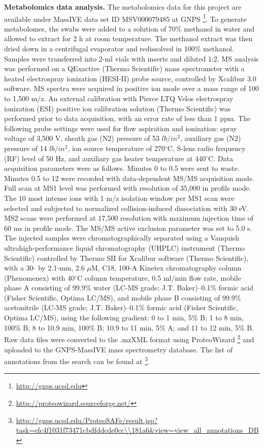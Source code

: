 \textbf{Metabolomics data analysis.} The metabolomics data for this project are
available under MassIVE data set ID MSV000079485 at GNPS \footnote{\url{http://gnps.ucsd.edu}}.
To generate metabolomes, the swabs were added to a solution of 70\% methanol in water and
allowed to extract for 2 h at room temperature. The methanol extract was then dried down in
a centrifugal evaporator and redissolved in 100\% methanol. Samples were transferred into
2-ml vials with inserts and diluted 1:2. MS analysis was performed on a QExactive
(Thermo Scientific) mass spectrometer with a heated electrospray ionization (HESI-II)
probe source, controlled by Xcalibur 3.0 software. MS spectra were acquired in positive
ion mode over a mass range of 100 to 1,500 m/z. An external calibration with Pierce LTQ
Velos electrospray ionization (ESI) positive ion calibration solution (Thermo Scientific)
was performed prior to data acquisition, with an error rate of less than 1 ppm. The following
probe settings were used for flow aspiration and ionization: spray voltage of 3,500 V,
sheath gas (N2) pressure of 53 $lb/in^2$, auxiliary gas (N2) pressure of 14 $lb/in^2$, ion
source temperature of 270$^{\circ}$C, S-lens radio frequency (RF) level of 50 Hz, and
auxiliary gas heater temperature at 440$^{\circ}$C. Data acquisition parameters were as
follows. Minutes 0 to 0.5 were sent to waste. Minutes 0.5 to 12 were recorded with
data-dependent MS/MS acquisition mode. Full scan at MS1 level was performed with
resolution of 35,000 in profile mode. The 10 most intense ions with 1 m/z isolation
window per MS1 scan were selected and subjected to normalized collision-induced dissociation
with 30 eV. MS2 scans were performed at 17,500 resolution with maximum injection time of 60
ms in profile mode. The MS/MS active exclusion parameter was set to 5.0 s. The injected
samples were chromatographically separated using a Vanquish ultrahigh-performance
liquid chromatography (UHPLC) instrument (Thermo Scientific) controlled by Thermo SII for
Xcalibur software (Thermo Scientific), with a 30- by 2.1-mm, 2.6 $\mu$M, C18, 100-A
Kinetex chromatography column (Phenomenex) with 40$^{\circ}$C column temperature, 0.5
ml/min flow rate, mobile phase A consisting of 99.9\% water (LC-MS grade; J.T. Baker)–0.1\%
formic acid (Fisher Scientific, Optima LC/MS), and mobile phase B consisting of 99.9\%
acetonitrile (LC-MS grade; J.T. Baker)–0.1\% formic acid (Fisher Scientific, Optima LC/MS),
using the following gradient: 0 to 1 min, 5\% B; 1 to 8 min, 100\% B; 8 to 10.9 min,
100\% B; 10.9 to 11 min, 5\% A; and 11 to 12 min, 5\% B. Raw data files were converted
to the .mzXML format using ProteoWizard \footnote{\url{http://proteowizard.sourceforge.net/}}
and uploaded to the GNPS-MassIVE mass spectrometry database. The list of annotations
from the search can be found at \footnote{\url{http://gnps.ucsd.edu/ProteoSAFe/result.jsp?task=efc4f1031f73471cbdfddcde0cc\\181a6\&view=view\_all\_annotations\_DB}}.

